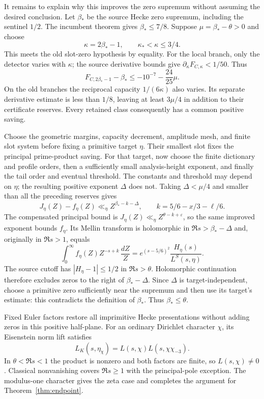\documentclass[11pt]{article}
\newcommand{\eps}{\varepsilon}
\begin{document}
It remains to explain why this improves the zero supremum without
assuming the desired conclusion. Let $\beta_*$ be the source Hecke
zero supremum, including the sentinel $1/2$. The incumbent theorem
gives $\beta_*\le7/8$. Suppose $\mu=\beta_*-\theta>0$ and choose
\[
 \kappa=2\beta_*-1,\qquad \kappa_*<\kappa\le3/4.
\]
This meets the old slot-zero hypothesis by equality. For the local
branch, only the detector varies with $\kappa$; the source derivative
bounds give $\partial_\kappa F_{C,\kappa}<1/50$. Thus
\[
 F_{C,2\beta_*-1}-\beta_*
 \le-10^{-7}-\frac{24}{25}\mu.
\]
On the old branches the reciprocal capacity $1/(6\kappa)$ also varies.
Its separate derivative estimate is less than $1/8$, leaving at least
$3\mu/4$ in addition to their certificate reserves. Every retained
class consequently has a common positive saving.

Choose the geometric margins, capacity decrement, amplitude mesh, and
finite slot system before fixing a primitive target $\eta$. Their
smallest slot fixes the principal prime-product saving. For that target,
now choose the finite dictionary and profile orders, then a sufficiently
small analysis-height exponent, and finally the tail order and eventual
threshold. The constants and threshold may depend on $\eta$; the
resulting positive exponent $\Delta$ does not. Taking $\Delta<\mu/4$
and smaller than all the preceding reserves gives
\[
 J_\eta(Z)-f_\eta(Z)\ll_\eta Z^{\beta_*-k-\Delta},
 \qquad k=5/6-x/3-\ell/6.
\]
The compensated principal bound is
$J_\eta(Z)\ll_\eta Z^{\theta-k+\eps}$, so the same improved exponent
bounds $f_\eta$. Its Mellin transform is holomorphic in
$\Re s>\beta_*-\Delta$ and, originally in $\Re s>1$, equals
\[
 \int_0^\infty f_\eta(Z)Z^{-s+k}\,\frac{dZ}{Z}
 =e^{(s-5/6)^2}\frac{H_\eta(s)}{L^S(s,\eta)}.
\]
The source cutoff has $|H_\eta-1|\le1/2$ in $\Re s>\theta$.
Holomorphic continuation therefore excludes zeros to the right of
$\beta_*-\Delta$. Since $\Delta$ is target-independent, choose a
primitive zero sufficiently near the supremum and then use its target's
estimate: this contradicts the definition of $\beta_*$. Thus
$\beta_*\le\theta$.

Fixed Euler factors restore all imprimitive Hecke presentations without
adding zeros in this positive half-plane. For an ordinary Dirichlet
character $\chi$, its Eisenstein norm lift satisfies
\[
 L_K(s,\eta_\chi)=L(s,\chi)L(s,\chi\chi_{-3}).
\]
In $\theta<\Re s<1$ the product is nonzero and both factors are finite,
so $L(s,\chi)\ne0$. Classical nonvanishing covers $\Re s\ge1$ with
the principal-pole exception. The modulus-one character gives the zeta
case and completes the argument for Theorem~\ref{thm:endpoint}.
\end{document}
